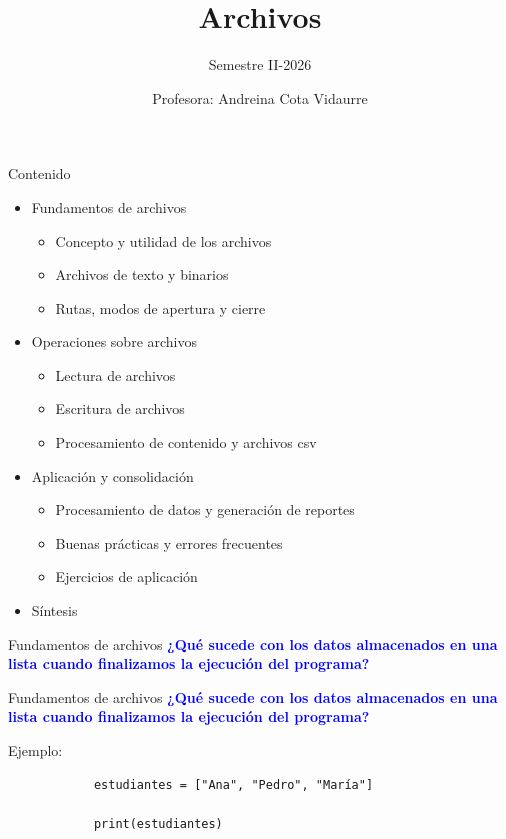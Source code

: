 \documentclass{beamer}
\title{Archivos} %
\subtitle{Semestre II-2026} %
\author{Profesora: Andreina Cota Vidaurre}
\begin{document}
  \shorthandoff{-}
  \frame[c]{\maketitle}

    \begin{frame}{Contenido}
        \begin{itemize}
            \item Fundamentos de archivos
            \begin{itemize}
                \item Concepto y utilidad de los archivos
                \item Archivos de texto y binarios
                \item Rutas, modos de apertura y cierre
            \end{itemize}
            \item Operaciones sobre archivos
            \begin{itemize}
                \item Lectura de archivos
                \item Escritura de archivos
                \item Procesamiento de contenido y archivos csv
            \end{itemize}
            \item Aplicación y consolidación
            \begin{itemize}
                \item Procesamiento de datos y generación de reportes
                \item Buenas prácticas y errores frecuentes 
                \item Ejercicios de aplicación
            \end{itemize}
            \item Síntesis
        \end{itemize}
    \end{frame}

    \begin{frame}{Fundamentos de archivos}
        \textcolor{blue}{\textbf{¿Qué sucede con los datos almacenados en una lista cuando finalizamos la ejecución del programa?}}
    \end{frame}

    \begin{frame}[fragile, t]{Fundamentos de archivos}
        \textcolor{blue}{\textbf{¿Qué sucede con los datos almacenados en una lista cuando finalizamos la ejecución del programa?}}

        Ejemplo:
        \begin{verbatim}
            estudiantes = ["Ana", "Pedro", "María"]

            print(estudiantes)
        \end{verbatim}
    \end{frame}
\end{document}
